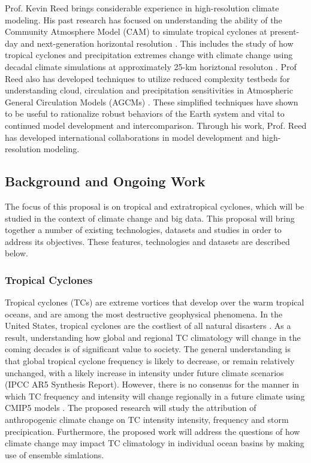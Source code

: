 \documentclass[11pt]{article}
\begin{document}
Prof. Kevin Reed brings considerable experience in high-resolution climate modeling.  His past research has focused on understanding the ability of the Community Atmosphere Model (CAM) to simulate tropical cyclones at present-day and next-generation horizontal resolution \citep{Reed2011a,Reed2011c}.  This includes the study of how tropical cyclones and precipitation extremes change with climate change using decadal climate simulations at approximately 25-km horiztonal resoluton \citep{Wehner2014}. Prof Reed also has developed techniques to utilize reduced complexity testbeds for understanding cloud, circulation and precipitation sensitivities in Atmospheric General Circulation Models (AGCMs) \citep{Reed2012a,Reed2014}. These simplified techniques have shown to be useful to rationalize robust behaviors of the Earth system and vital to continued model development and intercomparison. Through his work, Prof. Reed has developed international collaborations in model development and high-resolution modeling.

\subsection{Background and Ongoing Work} \label{sec:BackgroundOngoingWork}

The focus of this proposal is on tropical and extratropical cyclones, which will be studied in the context of climate change and big data.  This proposal will bring together a number of existing technologies, datasets and studies in order to address its objectives.  These features, technologies and datasets are described below.

\subsubsection{Tropical Cyclones}
Tropical cyclones (TCs) are extreme vortices that develop over the warm tropical oceans, and are among the most destructive geophysical phenomena. In the United States, tropical cyclones are the costliest of all natural disasters \citep{Pielke1998}. As a result, understanding how global and regional TC climatology will change in the coming decades is of significant value to society. The general understanding is that global tropical cyclone frequency is likely to decrease, or remain relatively unchanged, with a likely increase in intensity under future climate scenarios (IPCC AR5 Synthesis Report). However, there is no consenus for the manner in which TC frequency and intensity will change regionally in a future climate using CMIP5 models \citep{Camargo2013}. The proposed research will study the attribution of anthropogenic climate change on TC intensity intensity, frequency and storm precipication. Furthermore, the proposed work will address the questions of how climate change may impact TC climatology in individual ocean basins by making use of ensemble simlations.  
\end{document}
